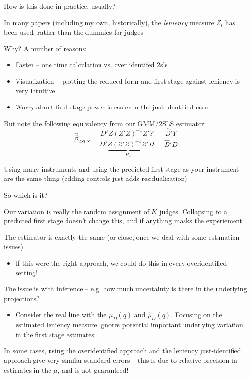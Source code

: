 \documentclass[notes,11pt, aspectratio=169]{beamer}
\newenvironment{wideitemize}{\itemize\addtolength{\itemsep}{10pt}}{\enditemize}
\begin{document}
\begin{frame}{How is this done in practice, usually?}
  \begin{wideitemize}
  \item In many papers (including my own, historically), the
    \emph{leniency} measure $Z_{i}$ has been used, rather than the
    dummies for judges
  \item Why? A number of reasons:
    \begin{itemize}
    \item Faster -- one time calculation vs. over identifed 2sls
    \item Visualization -- plotting the reduced form and first stage against leniency is very intuitive
    \item Worry about first stage power is easier in the just identified case
    \end{itemize}
  \item But note the following equivalency from our GMM/2SLS estimator:
    \begin{equation}
      \hat{\beta}_{2SLS} = \frac{D'Z(Z'Z)^{-1}Z'Y}{D'\underbrace{Z(Z'Z)^{-1}Z'}_{P_{Z}}D} = \frac{\hat{D}'Y}{\hat{D}'D} 
    \end{equation}
  \item Using many instruments and using the predicted first stage
    as your instrument are the same thing (adding controls just adds residualization)
  \end{wideitemize}
\end{frame}

\begin{frame}{So which is it?}
  \begin{wideitemize}
  \item Our variation is really the random assignment of $K$
    judges. Collapsing to a predicted first stage doesn't change this,
    and if anything masks the experiement
  \item The estimator is exactly the same (or close, once we deal with
    some estimation issues)
    \begin{itemize}
    \item If this were the right approach, we could do this in every overidentified setting! 
    \end{itemize}
  \item The issue is with inference -- e.g. how much uncertainty is there in the underlying projections?
    \begin{itemize}
    \item Consider the real line with the $\mu_{D}(q)$ and
      $\hat{\mu}_{D}(q)$. Focusing on the estimated leniency measure
      ignores potential important underlying variation in the first stage estimates
    \end{itemize}
  \item In some cases, using the overidentified approach and the
    leniency just-identified approach give very similar standard
    errors -- this is due to relative precision in estimates
    in the $\mu$, and is not guaranteed!
  \end{wideitemize}
\end{frame}
\end{document}
